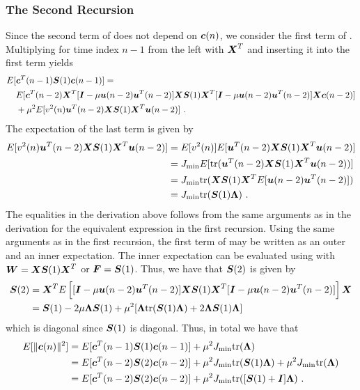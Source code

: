 \subsubsection{The Second Recursion}
Since the second term of  does not depend on $\boldsymbol{c}(n)$, we consider the first term of . Multiplying  for time index $n-1$ from the left with $\boldsymbol{X}^T$ and inserting it into the first term yields
\begin{align}
  E[&\boldsymbol{c}^T(n-1)\boldsymbol{S}(1)\boldsymbol{c}(n-1)] = \notag\\
  &E[\boldsymbol{c}^T(n-2)\boldsymbol{X}^T[\boldsymbol{I}-\mu\boldsymbol{u}(n-2)\boldsymbol{u}^T(n-2)]\boldsymbol{X}\boldsymbol{S}(1)\boldsymbol{X}^T[\boldsymbol{I}-\mu\boldsymbol{u}(n-2)\boldsymbol{u}^T(n-2)]\boldsymbol{X}\boldsymbol{c}(n-2)]\notag\\
  &{}+\mu^2 E[v^2(n)\boldsymbol{u}^T(n-2)\boldsymbol{X}\boldsymbol{S}(1)\boldsymbol{X}^T\boldsymbol{u}(n-2)]\ .
  \label{eq:app_lms_second_recur_start}
\end{align}
The expectation of the last term is given by
\begin{align}
 E[v^2(n)\boldsymbol{u}^T(n-2)\boldsymbol{X}\boldsymbol{S}(1)\boldsymbol{X}^T\boldsymbol{u}(n-2)] &= E[v^2(n)]E[\boldsymbol{u}^T(n-2)\boldsymbol{X}\boldsymbol{S}(1)\boldsymbol{X}^T\boldsymbol{u}(n-2)]\notag\\
 &= J_\textup{min} E[\textup{tr}(\boldsymbol{u}^T(n-2)\boldsymbol{X}\boldsymbol{S}(1)\boldsymbol{X}^T\boldsymbol{u}(n-2))]\notag\\
 &= J_\textup{min} \textup{tr}(\boldsymbol{X}\boldsymbol{S}(1)\boldsymbol{X}^TE[\boldsymbol{u}(n-2)\boldsymbol{u}^T(n-2)])\notag\\
 &= J_\textup{min}\textup{tr}(\boldsymbol{S}(1)\boldsymbol{\Lambda})\ .
\end{align}
The equalities in the derivation above follows from the same arguments as in the derivation for the equivalent expression in the first recursion. Using the same arguments as in the first recursion, the first term of  may be written as an outer and an inner expectation. The inner expectation can be evaluated using  with $\boldsymbol{W}=\boldsymbol{XS}(1)\boldsymbol{X}^T$ or $\boldsymbol{F}=\boldsymbol{S}(1)$. Thus, we have that $\boldsymbol{S}(2)$ is given by
\begin{align}
  \boldsymbol{S}(2) &= \boldsymbol{X}^TE\left[[\boldsymbol{I}-\mu\boldsymbol{u}(n-2)\boldsymbol{u}^T(n-2)]\boldsymbol{X}\boldsymbol{S}(1)\boldsymbol{X}^T[\boldsymbol{I}-\mu\boldsymbol{u}(n-2)\boldsymbol{u}^T(n-2)]\right]\boldsymbol{X}\notag\\
  &= \boldsymbol{S}(1) - 2\mu\boldsymbol{\Lambda}\boldsymbol{S}(1)+\mu^2[\boldsymbol{\Lambda}\textup{tr}(\boldsymbol{S}(1)\boldsymbol{\Lambda})+2\boldsymbol{\Lambda}\boldsymbol{S}(1)\boldsymbol{\Lambda}]
\end{align}
which is diagonal since $\boldsymbol{S}(1)$ is diagonal. Thus, in total we have that
\begin{align}
    E[\|\vect{c}(n)\|^2] &= E[\vect{c}^T(n-1)\vect{S}(1)\vect{c}(n-1)] +\mu^2J_\textup{min}\tr{\vect{\Lambda}}\\
    &= E[\vect{c}^T(n-2)\vect{S}(2)\vect{c}(n-2)]+\mu^2J_\textup{min}\tr{\vect{S}(1)\vect{\Lambda}}+\mu^2J_\textup{min}\tr{\vect{\Lambda}}\\
    &= E[\vect{c}^T(n-2)\vect{S}(2)\vect{c}(n-2)]+\mu^2J_\textup{min}\tr{[\vect{S}(1)+\vect{I}]\vect{\Lambda}}\ .
    \label{eq:app_lms_second_recur}
\end{align}

